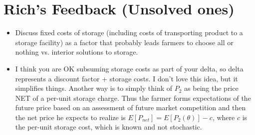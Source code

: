 \section{Rich's Feedback (Unsolved ones)}
\begin{itemize}
    \item Discuss fixed costs of storage (including costs of transporting product to a storage facility) as a factor that probably leads farmers to choose all or nothing vs. interior solutions to storage.
    
    \item I think you are OK subsuming storage costs as part of your delta, so delta represents a discount factor + storage costs. I don’t love this idea, but it simplifies things. Another way is to simply think of $P_2$ as being the price NET of a per-unit storage charge. Thus the farmer forms expectations of the future price based on an assessment of future market competition and then the net price he expects to realize is $E[P_{net}] = E[P_2(\theta)] - c$, where $c$ is the per-unit storage cost, which is known and not stochastic.
\end{itemize}